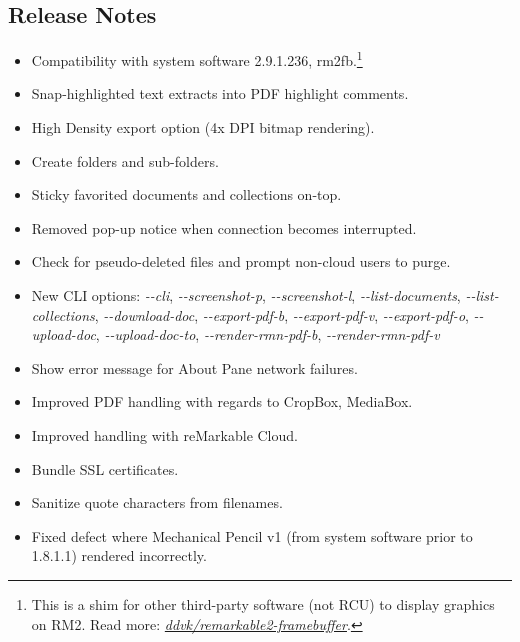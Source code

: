 \documentclass{memoir}
\begin{document}
{{%

\subsection{Release Notes}
\begin{itemize}
\item{Compatibility with system software 2.9.1.236, rm2fb.\footnote{This is a shim for other third-party software (not RCU) to display graphics on RM2. Read more: \textit{\href{https://github.com/ddvk/remarkable2-framebuffer}{ddvk/remarkable2-framebuffer}}.}}
  \item{Snap-highlighted text extracts into PDF highlight comments.}
  \item{High Density export option (4x DPI bitmap rendering).}
  \item{Create folders and sub-folders.}
\item{Sticky favorited documents and collections on-top.}
\item{Removed pop-up notice when connection becomes interrupted.}
  \item{Check for pseudo-deleted files and prompt non-cloud users to purge.}
    \item{New CLI options: \textit{\--\--cli}, \textit{\--\--screenshot-p}, \textit{\--\--screenshot-l}, \textit{\--\--list-documents}, \textit{\--\--list-collections}, \linebreak\textit{\--\--download-doc}, \textit{\--\--export-pdf-b}, \textit{\--\--export-pdf-v}, \textit{\--\--export-pdf-o}, \textit{\--\--upload-doc}, \linebreak\textit{\--\--upload-doc-to}, \textit{\--\--render-rmn-pdf-b}, \textit{\--\--render-rmn-pdf-v}}
    \item{Show error message for About Pane network failures.}
\item{Improved PDF handling with regards to CropBox, MediaBox.}
\item{Improved handling with reMarkable Cloud.}
\item{Bundle SSL certificates.}
  \item{Sanitize quote characters from filenames.}
\item{Fixed defect where Mechanical Pencil v1 (from system software prior to 1.8.1.1) rendered incorrectly.}

\end{itemize}}}
\end{document}
